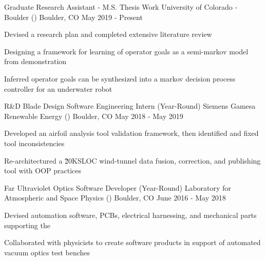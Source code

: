 \begin{cventries}
  \cventry
    {Graduate Research Assistant - M.S. Thesis Work}
    {University of Colorado - Boulder ()}
    {Boulder, CO}
    {May 2019 - Present}
    {
      \begin{cvitems}
        \item {Devised a research plan and completed extensive literature review}
        \item {Designing a framework for learning of operator goals as a semi-markov model from demonstration}
        \item {Inferred operator goals can be synthesized into a markov decision process controller for an underwater robot}
      \end{cvitems}
    }
    \cventry
    {R\&D Blade Design Software Engineering Intern (Year-Round)}
    {Siemens Gamesa Renewable Energy ()}
    {Boulder, CO}
    {May 2018 - May 2019}
    {
      \begin{cvitems}
        \item {Developed an airfoil analysis tool validation framework, then identified and fixed tool inconsistencies}
        \item {Re-architectured a \~20KSLOC wind-tunnel data fusion, correction, and publishing tool with OOP practices}
      \end{cvitems}
    }

  \cventry
    {Far Ultraviolet Optics Software Developer (Year-Round)}
    {Laboratory for Atmospheric and Space Physics () }
    {Boulder, CO}
    {June 2016 - May 2018}
    {
      \begin{cvitems}
        \item {Devised automation software, PCBs, electrical harnessing, and mechanical parts supporting the }
        \item {Collaborated with physicists to create software products in support of automated vacuum optics test benches}
      \end{cvitems}
    }
\end{cventries}
